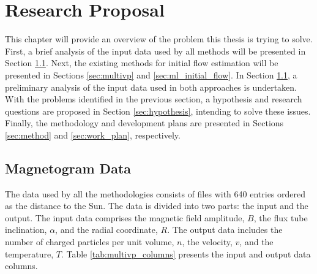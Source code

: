 \chapter{Research Proposal}\label{chap:research_proposal}

This chapter will provide an overview of the problem this thesis is trying to solve. First, a brief analysis of the input data used by all methods will be presented in Section \ref*{sec:prelim_data_analysis}. Next, the existing methods for initial flow estimation will be presented in Sections \ref{sec:multivp} and \ref{sec:ml_initial_flow}. In Section \ref{sec:prelim_data_analysis}, a preliminary analysis of the input data used in both approaches is undertaken. With the problems identified in the previous section, a hypothesis and research questions are proposed in Section \ref{sec:hypothesis}, intending to solve these issues. Finally, the methodology and development plans are presented in Sections \ref{sec:method} and \ref{sec:work_plan}, respectively.

\section{Magnetogram Data}\label{sec:prelim_data_analysis}

The data used by all the methodologies consists of files with 640 entries ordered as the distance to the Sun. The data is divided into two parts: the input and the output. The input data comprises the magnetic field amplitude, $B$, the flux tube inclination, $\alpha$, and the radial coordinate, $R$. The output data includes the number of charged particles per unit volume, $n$, the velocity, $v$, and the temperature, $T$. Table \ref{tab:multivp_columns} presents the input and output data columns.


